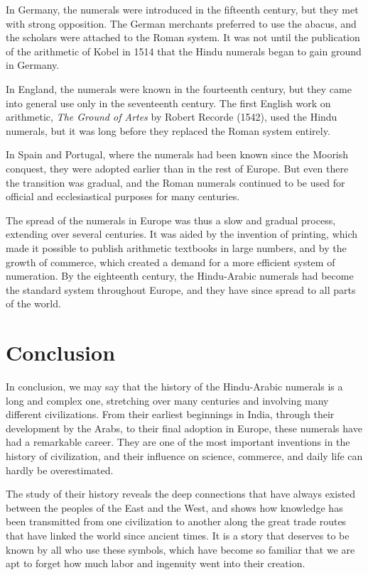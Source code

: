 \documentclass[11pt,a4paper]{article}
\begin{document}
In Germany, the numerals were introduced in the fifteenth century, but they met with strong opposition. The German merchants preferred to use the abacus, and the scholars were attached to the Roman system. It was not until the publication of the arithmetic of Kobel in 1514 that the Hindu numerals began to gain ground in Germany.

In England, the numerals were known in the fourteenth century, but they came into general use only in the seventeenth century. The first English work on arithmetic, \textit{The Ground of Artes} by Robert Recorde (1542), used the Hindu numerals, but it was long before they replaced the Roman system entirely.

In Spain and Portugal, where the numerals had been known since the Moorish conquest, they were adopted earlier than in the rest of Europe. But even there the transition was gradual, and the Roman numerals continued to be used for official and ecclesiastical purposes for many centuries.

The spread of the numerals in Europe was thus a slow and gradual process, extending over several centuries. It was aided by the invention of printing, which made it possible to publish arithmetic textbooks in large numbers, and by the growth of commerce, which created a demand for a more efficient system of numeration. By the eighteenth century, the Hindu-Arabic numerals had become the standard system throughout Europe, and they have since spread to all parts of the world.


\section*{Conclusion}

In conclusion, we may say that the history of the Hindu-Arabic numerals is a long and complex one, stretching over many centuries and involving many different civilizations. From their earliest beginnings in India, through their development by the Arabs, to their final adoption in Europe, these numerals have had a remarkable career. They are one of the most important inventions in the history of civilization, and their influence on science, commerce, and daily life can hardly be overestimated.

The study of their history reveals the deep connections that have always existed between the peoples of the East and the West, and shows how knowledge has been transmitted from one civilization to another along the great trade routes that have linked the world since ancient times. It is a story that deserves to be known by all who use these symbols, which have become so familiar that we are apt to forget how much labor and ingenuity went into their creation.
\end{document}
